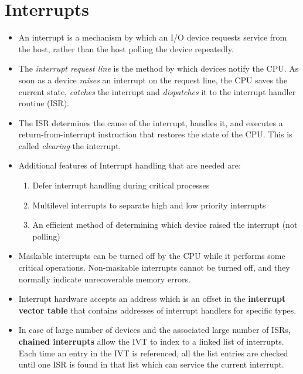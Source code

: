 \documentclass{article}
\theoremstyle{plain}
\theoremstyle{definition}
\begin{document}
\section{Interrupts}
\begin{itemize}
    \item An interrupt is a mechanism by which an I/O device requests service from the host, rather than the host polling the device repeatedly. 
    
    \item The \textit{interrupt request line} is the method by which devices notify the CPU. As soon as a device \textit{raises} an interrupt on the request line, the CPU saves the current state, \textit{catches} the interrupt and \textit{dispatches} it to the interrupt handler routine (ISR). 
    
    \item The ISR determines the cause of the interrupt, handles it, and executes a return-from-interrupt instruction that restores the state of the CPU. This is called\textit{ clearing} the interrupt.  
    
    \item Additional features of Interrupt handling that are needed are:
    \begin{enumerate}
        \item Defer interrupt handling during critical processes
        
        \item Multilevel interrupts to separate high and low priority interrupts
        
        \item An efficient method of determining which device raised the interrupt (not polling)
    \end{enumerate}  
    
    \item Maskable interrupts can be turned off by the CPU while it performs some critical operations. Non-maskable interrupts cannot be turned off, and they normally indicate unrecoverable memory errors. 
    
    \item Interrupt hardware accepts an address which is an offset in the \textbf{interrupt vector table} that contains addresses of interrupt handlers for specific types. 
    
    \item In case of large number of devices and the associated large number of ISRs, \textbf{chained interrupts} allow the IVT to index to a linked list of interrupts. Each time an entry in the IVT is referenced, all the list entries are checked until one ISR is found in that list which can service the current interrupt. 
    

\end{itemize}
\end{document}
